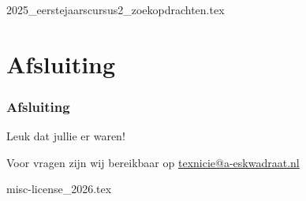 \documentclass[allauthors,dutch]{../../../cursuspresentatie3}
\def\importslideh#1#2{%
	{#2}
}
\def\importslidej#1#2{%
	{#2}
}
\begin{document}

\importslidej{cursus2}{2025_eerstejaarscursus2_zoekopdrachten.tex}


\section{Afsluiting}
\begin{frame}
	\frametitle{Afsluiting}
	Leuk dat jullie er waren!
	
	Voor vragen zijn wij bereikbaar op 
	\href{mailto:texnicie@a-eskwadraat.nl}{texnicie@a-eskwadraat.nl}
\end{frame}

{misc-license_2026.tex}
\end{document}

